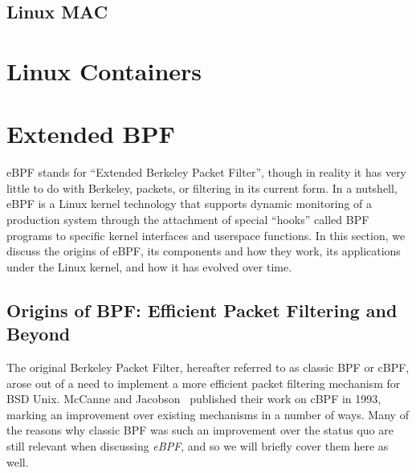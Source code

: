 \subsection{Linux MAC}%
\label{ss:linux-mac-bg}




\section{Linux Containers}%
\label{s:containers-bg}




\section{Extended BPF}%
\label{s:ebpf-bg}

eBPF stands for \enquote{Extended Berkeley Packet Filter}, though in reality it has very
little to do with Berkeley, packets, or filtering in its current form.  In a nutshell,
eBPF is a Linux kernel technology that supports dynamic monitoring of a production system
through the attachment of special \enquote{hooks} called BPF programs to specific kernel
interfaces and userspace functions. In this section, we discuss the origins of eBPF, its
components and how they work, its applications under the Linux kernel, and how it has
evolved over time.

\subsection{Origins of BPF\@: Efficient Packet Filtering and Beyond}%
\label{ss:origins-of-bpf-bg}

The original Berkeley Packet Filter, hereafter referred to as classic BPF or cBPF, arose
out of a need to implement a more efficient packet filtering mechanism for BSD Unix.
McCanne and Jacobson~\cite{mccanne1993_bpf} published their work on cBPF in 1993, marking
an improvement over existing mechanisms in a number of ways. Many of the reasons why
classic BPF was such an improvement over the status quo are still relevant when discussing
\textit{eBPF}, and so we will briefly cover them here as well.

